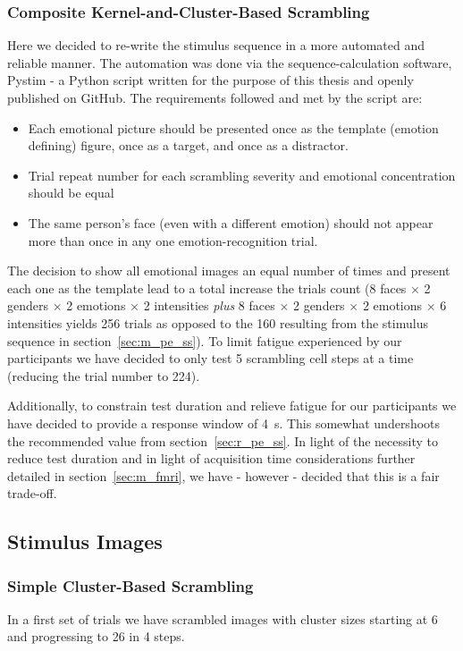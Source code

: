 	    \subsubsection{Composite Kernel-and-Cluster-Based Scrambling}
		Here we decided to re-write the stimulus sequence in a more automated and reliable manner.
		The automation was done via the sequence-calculation software, Pystim \citep{pystim} - a Python script written for the purpose of this thesis and openly published on GitHub.
		The requirements followed and met by the script are:
		\begin{itemize}
		    \item Each emotional picture should be presented once as the template (emotion defining) figure, once as a target, and once as a distractor.
		    \item Trial repeat number for each scrambling severity and emotional concentration should be equal
		    \item The same person's face (even with a different emotion) should not appear more than once in any one emotion-recognition trial.
		\end{itemize}
		The decision to show all emotional images an equal number of times and present each one as the template lead to a total increase the trials count
		(8 faces $\times$ 2 genders $\times$ 2 emotions $\times$ 2 intensities \textit{plus} 8 faces $\times$ 2 genders $\times$ 2 emotions $\times$ 6 intensities yields 256 trials as opposed to the 160 resulting from the stimulus sequence in section~\ref{sec:m_pe_ss}).
		To limit fatigue experienced by our participants we have decided to only test 5 scrambling cell steps at a time (reducing the trial number to 224).
		
		Additionally, to constrain test duration and relieve fatigue for our participants we have decided to provide a response window of \SI{4}{\second}.
		This somewhat undershoots the recommended value from section~\ref{sec:r_pe_ss}.
		In light of the necessity to reduce test duration and in light of acquisition time considerations further detailed in section~\ref{sec:m_fmri}, we have - however - decided that this is a fair trade-off.
	\subsection{Stimulus Images}
	    \subsubsection{Simple Cluster-Based Scrambling}\label{sec:pe_m_si}
		In a first set of trials we have scrambled images with cluster sizes starting at \SI{6}{\pixel} and progressing to \SI{26}{\pixel} in \SI{4}{\pixel} steps.
